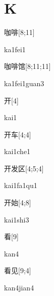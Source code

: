 ﻿%
\section*{K}

\begin{verbete}[ka1fei1]{咖啡}[8;11]
\begin{pronuncia}{ka1fei1}
\end{pronuncia}
\end{verbete}

\begin{verbete}{咖啡馆}[8;11;11]
\begin{pronuncia}{ka1fei1guan3}
\end{pronuncia}
\end{verbete}

\begin{verbete}[kai1]{开}[4]
\begin{pronuncia}{kai1}
\end{pronuncia}
\end{verbete}

\begin{verbete}{开车}[4;4]
\begin{pronuncia}{kai1che1}
\end{pronuncia}
\end{verbete}

\begin{verbete}[kai1fa1qu1]{开发区}[4;5;4]
\begin{pronuncia}{kai1fa1qu1}
\end{pronuncia}
\end{verbete}

\begin{verbete}{开始}[4;8]
\begin{pronuncia}{kai1shi3}
\end{pronuncia}
\end{verbete}

\begin{verbete}[kan4]{看}[9]
\begin{pronuncia}{kan4}
\end{pronuncia}
\end{verbete}

\begin{verbete}{看见}[9;4]
\begin{pronuncia}{kan4jian4}
\end{pronuncia}
\end{verbete}

